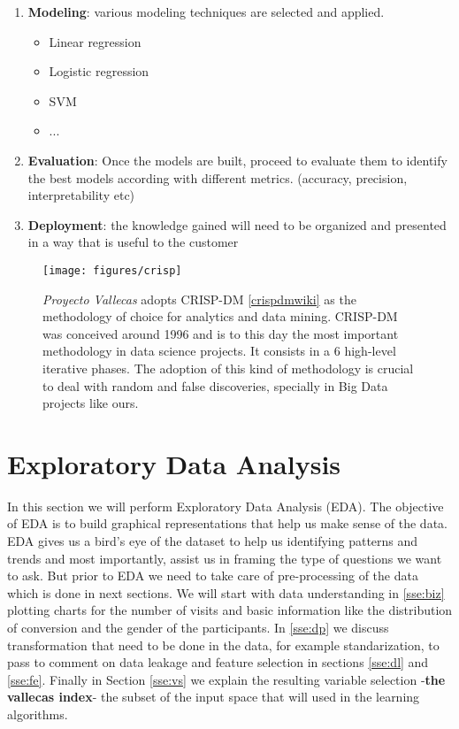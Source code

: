 \documentclass[11pt]{article}
\begin{document}
\begin{enumerate}
\begin{itemize}
	\end{itemize}
\item \textbf{Modeling}: various modeling techniques are selected and applied.
	\begin{itemize}
		\item Linear regression 
		\item Logistic regression
		\item SVM
		\item ...
	\end{itemize}
\item \textbf{Evaluation}: Once the models are built, proceed to evaluate them to identify the best models according with different metrics. (accuracy, precision, interpretability etc)
\item \textbf{Deployment}: the knowledge gained will need to be organized and presented in a way that is useful to the customer
\end{enumerate}


\begin{figure}[h!]
        \centering
        \texttt{[image: figures/crisp]}
        \caption{\emph{Proyecto Vallecas} adopts CRISP-DM \ref{crispdmwiki} as the methodology of choice for analytics and data mining. CRISP-DM was conceived around 1996  and is to this day the most important methodology in data science projects. It consists in a 6 high-level iterative phases. The adoption of this kind of methodology is crucial to deal with random and false discoveries, specially in Big Data projects like ours.}
\label{fig:tableclustervallecas}
\end{figure}

\section{Exploratory Data Analysis}
\label{se:eda}
In this section we will perform Exploratory Data Analysis (EDA). The objective of EDA is to build graphical representations that help us make sense of the data. EDA gives us a bird's eye of the dataset to help us identifying patterns and trends and most importantly, assist us in framing the type of  questions we want to ask.
But prior to EDA we need to take care of pre-processing of the data which is done in next sections. 
We will start with data understanding in \ref{sse:biz} plotting charts for the number of visits and basic information like the distribution of conversion and the gender of the participants. In \ref{sse:dp} we discuss transformation that need to be done in the data, for example standarization, to pass to comment on data leakage and feature selection in sections \ref{sse:dl} and \ref{sse:fe}. Finally in Section \ref{sse:vs} we explain the resulting variable selection -\textbf{the vallecas index}- the subset of the input space that will used in the learning algorithms.
\end{document}
